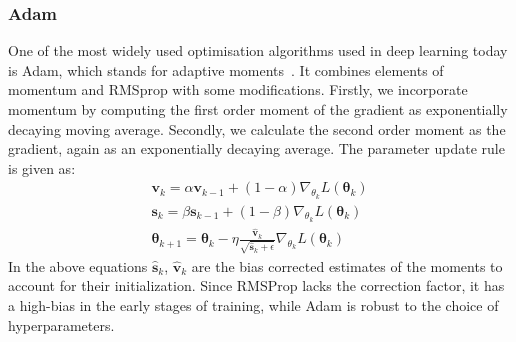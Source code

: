 \documentclass[11pt]{report}
\begin{document}
    \subsubsection{Adam}
    One of the most widely used optimisation algorithms used in deep learning today is Adam, which stands for
    adaptive moments~\cite{kingma2014adam}.
    It combines elements of momentum and RMSprop with some modifications.
    Firstly, we incorporate momentum by computing the first order moment of the gradient as exponentially decaying
    moving average.
    Secondly, we calculate the second order moment as the gradient, again as an exponentially decaying average.
    The parameter update rule is given as:
    \begin{align*}
        \pmb{v}_k = \alpha \pmb{v}_{k-1} + (1 - \alpha) \nabla_{\theta_k} L( \pmb\theta_{k} ) \\
        \pmb{s}_k = \beta \pmb{s}_{k-1} + (1 - \beta) \nabla_{\theta_k} L( \pmb\theta_{k} ) \\
        \pmb\theta_{k+1} = \pmb\theta_{k} - \eta \frac{\hat{\pmb{v}}_k}{  \sqrt{ \hat{\pmb{s}}_k + \epsilon }} \nabla_{\theta_k} L( \pmb\theta_k)
    \end{align*}
    In the above equations $\hat{\pmb{s}}_k$, $\hat{\pmb{v}}_k$ are the bias corrected estimates of the moments to account
    for their initialization.
    Since RMSProp lacks the correction factor, it has a high-bias in the early stages of training, while Adam is
    robust to the choice of hyperparameters.
\end{document}
